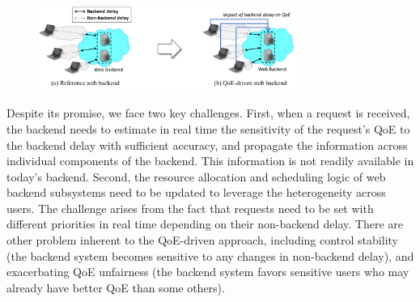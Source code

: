 \begin{figure}[t]
	\centering
	\vspace{-0.5cm}
	\includegraphics[width=0.75\textwidth]{figs/intro-overview-new.pdf}
	\vspace{-0.1cm}
	\label{fig:intro-overview}
\end{figure}





Despite its promise, we face two key challenges.
First, when a request is received, the backend needs to estimate in real time the sensitivity of the request's QoE to the backend delay with sufficient accuracy, and propagate the information across individual components of the backend. This information is not readily available in today's backend.
Second, the resource allocation and scheduling logic of web backend subsystems need to be updated to leverage the heterogeneity across users. The challenge arises from the fact that requests need to be set with different priorities in real time depending on their non-backend delay.
There are other problem inherent to the QoE-driven approach, including control stability (\ie the backend system becomes sensitive to any changes in non-backend delay), and exacerbating QoE unfairness (\ie the backend system favors sensitive users who may already have better QoE than some others).

